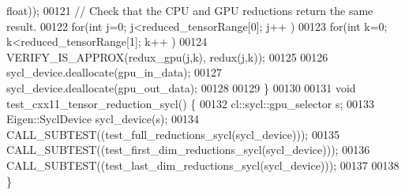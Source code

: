 \begin{DoxyCode}
      float));
00121   \textcolor{comment}{// Check that the CPU and GPU reductions return the same result.}
00122   \textcolor{keywordflow}{for}(\textcolor{keywordtype}{int} j=0; j<reduced\_tensorRange[0]; j++ )
00123     \textcolor{keywordflow}{for}(\textcolor{keywordtype}{int} k=0; k<reduced\_tensorRange[1]; k++ )
00124       VERIFY\_IS\_APPROX(redux\_gpu(j,k), redux(j,k));
00125 
00126   sycl\_device.deallocate(gpu\_in\_data);
00127   sycl\_device.deallocate(gpu\_out\_data);
00128 
00129 \}
00130 
00131 \textcolor{keywordtype}{void} test\_cxx11\_tensor\_reduction\_sycl() \{
00132   cl::sycl::gpu\_selector s;
00133   Eigen::SyclDevice sycl\_device(s);
00134   CALL\_SUBTEST((test\_full\_reductions\_sycl(sycl\_device)));
00135   CALL\_SUBTEST((test\_first\_dim\_reductions\_sycl(sycl\_device)));
00136   CALL\_SUBTEST((test\_last\_dim\_reductions\_sycl(sycl\_device)));
00137 
00138 \}
\end{DoxyCode}
